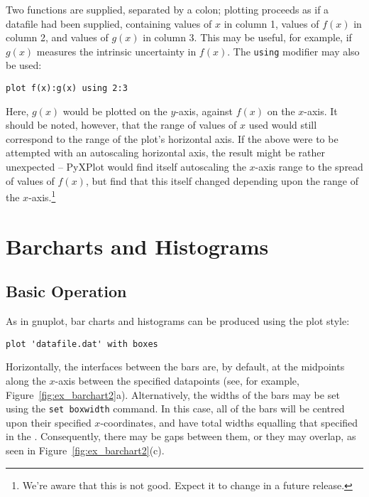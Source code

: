 \noindent Two functions are supplied, separated by a colon; plotting proceeds
as if a datafile had been supplied, containing values of $x$ in column 1,
values of $f(x)$ in column 2, and values of $g(x)$ in column 3. This may be
useful, for example, if $g(x)$ measures the intrinsic uncertainty in $f(x)$.
The {\tt using} modifier may also be used:

\begin{verbatim}
plot f(x):g(x) using 2:3
\end{verbatim}

Here, $g(x)$ would be plotted on the $y$-axis, against $f(x)$ on the $x$-axis.
It should be noted, however, that the range of values of $x$ used would still
correspond to the range of the plot's horizontal axis. If the above were to be
attempted with an autoscaling horizontal axis, the result might be rather
unexpected -- PyXPlot would find itself autoscaling the $x$-axis range to the
spread of values of $f(x)$, but find that this itself changed depending upon
the range of the $x$-axis.\footnote{We're aware that this is not good. Expect
it to change in a future release.}

\section{Barcharts and Histograms}
\label{barcharts}

\subsection{Basic Operation}

As in gnuplot, bar charts and histograms can be produced using the
 plot style:

\begin{verbatim} 
plot 'datafile.dat' with boxes
\end{verbatim}

\noindent Horizontally, the interfaces between the bars are, by default, at the
midpoints along the $x$-axis between the specified datapoints (see, for
example, Figure~\ref{fig:ex_barchart2}a).  Alternatively, the widths of the
bars may be set using the {\tt set boxwidth} command. In this case, all of
the bars will be centred upon their specified $x$-coordinates, and have total
widths equalling that specified in the . Consequently, there may be
gaps between them, or they may overlap, as seen in
Figure~\ref{fig:ex_barchart2}(c).


